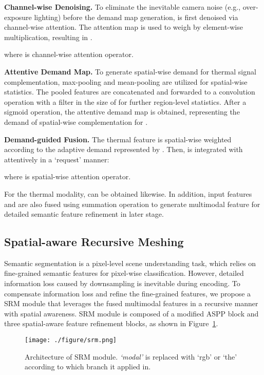 \documentclass[letterpaper, 10 pt, conference]{ieeeconf}
\begin{document}
\textbf{Channel-wise Denoising.} To eliminate the inevitable camera noise (e.g., over-exposure lighting) before the demand map generation,  is first denoised via channel-wise attention. The attention map  is used to weigh  by element-wise multiplication, resulting in .

where  is channel-wise attention operator.

\textbf{Attentive Demand Map.} To generate spatial-wise demand for thermal signal complementation, max-pooling and mean-pooling are utilized for spatial-wise statistics. The pooled features are concatenated and forwarded to a convolution operation with a filter in the size of  for further region-level statistics. After a sigmoid operation, the attentive demand map  is obtained, representing the demand of spatial-wise complementation for .

\textbf{Demand-guided Fusion.} The thermal feature  is spatial-wise weighted according to the adaptive demand represented by . Then,  is integrated with  attentively in a `request' manner:

where  is spatial-wise attention operator.

For the thermal modality,  can be obtained likewise. In addition, input features  and  are also fused using summation operation to generate multimodal feature  for detailed semantic feature refinement in later stage.



\subsection{Spatial-aware Recursive Meshing}
Semantic segmentation is a pixel-level scene understanding task, which relies on fine-grained semantic features for pixel-wise classification. However, detailed information loss caused by downsampling is inevitable during encoding. To compensate information loss and refine the fine-grained features, we propose a SRM module that leverages the fused multimodal features in a recursive manner with spatial awareness. SRM module is composed of a modified ASPP block \cite{deeplabv3} and three spatial-aware feature refinement blocks, as shown in Figure~\ref{fig:srm}.

\begin{figure}[htbp]
  \centering 
  \texttt{[image: ./figure/srm.png]}
  \caption{Architecture of SRM module. \textit{`modal'} is replaced with `rgb' or `the' according to which branch it applied in.}
  \label{fig:srm}
\end{figure}
\end{document}

